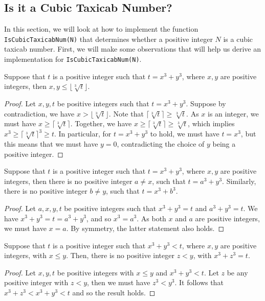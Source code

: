 
\subsection{Is it a Cubic Taxicab Number?}

In this section, we will look at how to implement the function \lstinline|IsCubicTaxicabNum(N)| that determines whether a positive integer $N$ is a cubic taxicab number. First, we will make some observations that will help us derive an implementation for \lstinline|IsCubicTaxicabNum(N)|.

\begin{claim}
	Suppose that $t$ is a positive integer such that $t = x^3 + y^3$, where $x, y$ are positive integers, then $x, y \leq \lfloor \sqrt[3]{t} \rfloor$.
\end{claim}
\begin{proof}
	Let $x, y, t$ be positive integers such that $t = x^3 + y^3$. Suppose by contradiction, we have $x > \lfloor \sqrt[3]{t} \rfloor$. Note that $\lceil \sqrt[3]{t} \rceil \geq \sqrt[3]{t}$. As $x$ is an integer, we must have $x \geq \lceil \sqrt[3]{t} \rceil$. Together, we have $x \geq \lceil \sqrt[3]{t} \rceil \geq \sqrt[3]{t}$, which implies $x^3 \geq \lceil \sqrt[3]{t} \rceil^3 \geq t$. In particular, for $t = x^3 + y^3$ to hold, we must have $t = x^3$, but this means that we must have $y = 0$, contradicting the choice of $y$ being a positive integer.
\end{proof}

\begin{observation}
	Suppose that $t$ is a positive integer such that $t = x^3 + y^3$, where $x, y$ are positive integers, then there is no positive integer $a \neq x$, such that $t = a^3 + y^3$. Similarly, there is no positive integer $b \neq y$, such that $t = x^3 + b^3$.
\end{observation}
\begin{proof}
	Let $a, x, y, t$ be positive integers such that $x^3 + y^3 = t$ and $a^3 + y^3 = t$. We have $x^3 + y^3 = t = a^3 + y^3$, and so $x^3 = a^3$. As both $x$ and $a$ are positive integers, we must have $x = a$. By symmetry, the latter statement also holds.
\end{proof}

\begin{observation}
	Suppose that $t$ is a positive integer such that $x^3 + y^3 < t$, where $x, y$ are positive integers, with $x \leq y$. Then, there is no positive integer $z < y$, with $x^3 + z^3 = t$.
\end{observation}
\begin{proof}
	Let $x, y, t$ be positive integers with $x \leq y$ and $x^3 + y^3 < t$. Let $z$ be any positive integer with $z < y$, then we must have $z^3 < y^3$. It follows that $x^3 + z^3 < x^3 + y^3 < t$ and so the result holds.
\end{proof}

